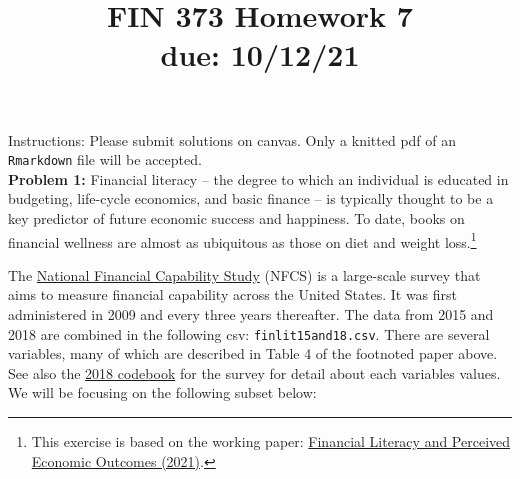 \documentclass[11pt]{article}
\begin{document}
\title{FIN 373 Homework 7 \\ {\large due: \textbf{10/12/21}}}
\date{}
\maketitle

\vspace{-20mm}

\noindent Instructions: Please submit solutions on canvas.  Only a knitted pdf of an {\tt Rmarkdown} file will be accepted.
\\

\noindent \textbf{Problem 1:} Financial literacy -- the degree to which an individual is educated in budgeting, life-cycle economics, and basic finance -- is typically thought to be a key predictor of future economic success and happiness.  To date, books on financial wellness are almost as ubiquitous as those on diet and weight loss.\footnote{This exercise is based on the working paper: \href{https://papers.ssrn.com/sol3/papers.cfm?abstract_id=3302978}{Financial Literacy and Perceived Economic Outcomes (2021)}.}

The \href{https://gflec.org/initiatives/national-financial-capability-study/}{National Financial Capability Study} (NFCS) is a large-scale survey that aims to measure financial capability across the United States.  It was first administered in 2009 and every three years thereafter.  The data from 2015 and 2018 are combined in the following csv: {\tt finlit15and18.csv}.  There are several variables, many of which are described in Table 4 of the footnoted paper above.  See also the \href{google.com}{2018 codebook} for the survey for detail about each variables values.  We will be focusing on the following subset below:
\end{document}
